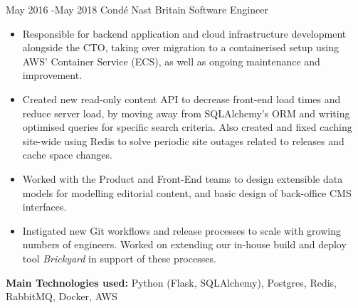 \documentclass[10pt]{article} %
\begin{document}
\jobheader
{May 2016 -}{May 2018}
{Condé Nast Britain}
{Software Engineer}
\vspace{-1cm}
  \begin{itemize}

  \item Responsible for backend application and cloud infrastructure development
        alongside the CTO, taking over migration to a containerised setup using AWS' Container Service (ECS), as well as ongoing maintenance and improvement.

  \item Created new read-only content API to decrease front-end load times and
        reduce server load, by moving away from SQLAlchemy's ORM and writing
        optimised queries for specific search criteria. Also created and fixed
        caching site-wide using Redis to solve periodic site outages related to
        releases and cache space changes.

  \item Worked with the Product and Front-End teams to design extensible data models
        for modelling editorial content, and basic design of back-office CMS
        interfaces.

  \item Instigated new Git workflows and release processes to scale with growing
        numbers of engineers. Worked on extending our in-house build and deploy
        tool \textit{Brickyard} in support of these processes.

  \end{itemize}

  \textbf{Main Technologies used:}
  Python (Flask, SQLAlchemy),
  Postgres, Redis, RabbitMQ, Docker, AWS
\end{document}
